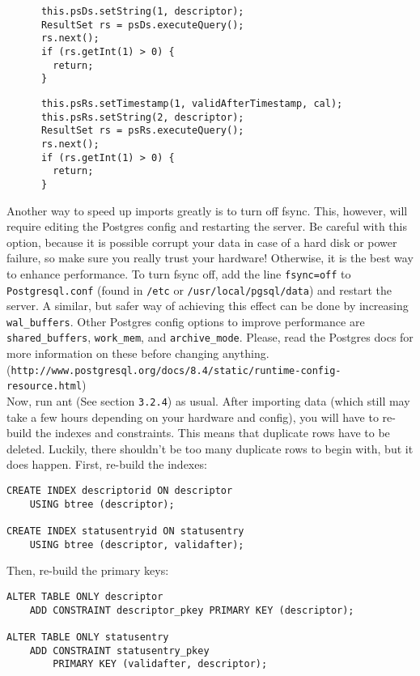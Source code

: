 \documentclass{article}
\begin{document}
\begin{verbatim}
      this.psDs.setString(1, descriptor);
      ResultSet rs = psDs.executeQuery();
      rs.next();
      if (rs.getInt(1) > 0) {
        return;
      }

\end{verbatim}
\begin{verbatim}
      this.psRs.setTimestamp(1, validAfterTimestamp, cal);
      this.psRs.setString(2, descriptor);
      ResultSet rs = psRs.executeQuery();
      rs.next();
      if (rs.getInt(1) > 0) {
        return;
      }
\end{verbatim}

Another way to speed up imports greatly is to turn off fsync. This, however,
will require editing the Postgres config and restarting the server. Be careful
with this option, because it is possible corrupt your data in case of a hard
disk or power failure, so make sure you really trust your hardware! Otherwise,
it is the best way to enhance performance. To turn fsync off, add the line
\verb+fsync=off+ to \verb+Postgresql.conf+ (found in \verb+/etc+ or
\verb+/usr/local/pgsql/data+) and restart the server. A similar, but safer way
of achieving this effect can be done by increasing \verb+wal_buffers+. Other
Postgres config options to improve performance are \verb+shared_buffers+,
\verb+work_mem+, and \verb+archive_mode+. Please, read the Postgres docs for
more information on these before changing anything.
\\

(\verb+http://www.postgresql.org/docs/8.4/static/runtime-config-resource.html+)
\\

Now, run ant (See section \verb+3.2.4+) as usual. After importing data (which
still may take a few hours depending on your hardware and config), you will have
to re-build the indexes and constraints.  This means that duplicate rows have to
be deleted. Luckily, there shouldn't be too many duplicate rows to begin with,
but it does happen. First, re-build the indexes:

\begin{verbatim}
CREATE INDEX descriptorid ON descriptor
    USING btree (descriptor);

CREATE INDEX statusentryid ON statusentry
    USING btree (descriptor, validafter);
\end{verbatim}

Then, re-build the primary keys:
\begin{verbatim}
ALTER TABLE ONLY descriptor
    ADD CONSTRAINT descriptor_pkey PRIMARY KEY (descriptor);

ALTER TABLE ONLY statusentry
    ADD CONSTRAINT statusentry_pkey
        PRIMARY KEY (validafter, descriptor);
\end{verbatim}
\end{document}
